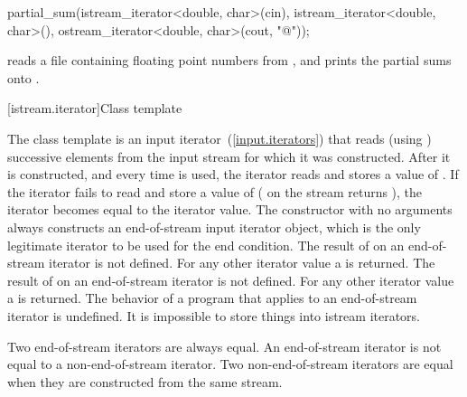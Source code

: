 \enterexample
\begin{codeblock}
partial_sum(istream_iterator<double, char>(cin),
  istream_iterator<double, char>(),
  ostream_iterator<double, char>(cout, "@\textbackslash@n"));
\end{codeblock}

reads a file containing floating point numbers from
,
and prints the partial sums onto
.
\exitexample

[istream.iterator]{Class template }

\pnum
{}%
The class template
is an input iterator~(\ref{input.iterators}) that
reads (using
)
successive elements from the input stream for which it was constructed.
After it is constructed, and every time
\tcode{++}
is used, the iterator reads and stores a value of
.
If the iterator fails to read and store a value of 
(
on the stream returns
),
the iterator becomes equal to the
iterator value.
The constructor with no arguments
always constructs
an end-of-stream input iterator object, which is the only legitimate iterator to be used
for the end condition.
The result of
on an end-of-stream iterator is not defined.
For any other iterator value a
is returned.
The result of
on an end-of-stream iterator is not defined.
For any other iterator value a
is returned.
The behavior of a program that applies  to an end-of-stream
iterator is undefined.
It is impossible to store things into istream iterators.

\pnum
Two end-of-stream iterators are always equal.
An end-of-stream iterator is not
equal to a non-end-of-stream iterator.
Two non-end-of-stream iterators are equal when they are constructed from the same stream.

